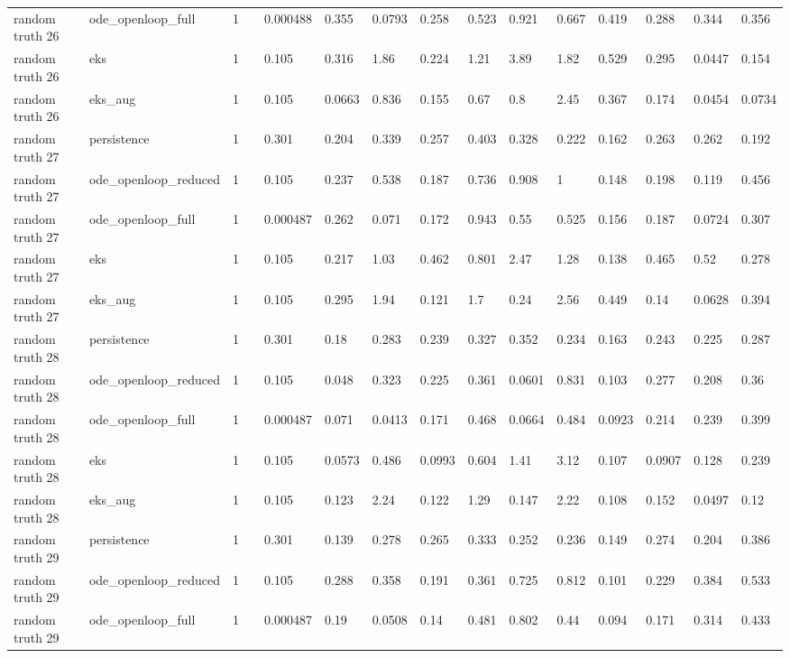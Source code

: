 \begin{table}[t]
\begin{tabular}{lllllllllllllll}
random truth 26 & ode\_openloop\_full & 1 &  & 0.000488 & 0.355 & 0.0793 & 0.258 & 0.523 & 0.921 & 0.667 & 0.419 & 0.288 & 0.344 & 0.356 \\
random truth 26 & eks & 1 &  & 0.105 & 0.316 & 1.86 & 0.224 & 1.21 & 3.89 & 1.82 & 0.529 & 0.295 & 0.0447 & 0.154 \\
random truth 26 & eks\_aug & 1 &  & 0.105 & 0.0663 & 0.836 & 0.155 & 0.67 & 0.8 & 2.45 & 0.367 & 0.174 & 0.0454 & 0.0734 \\
random truth 27 & persistence & 1 &  & 0.301 & 0.204 & 0.339 & 0.257 & 0.403 & 0.328 & 0.222 & 0.162 & 0.263 & 0.262 & 0.192 \\
random truth 27 & ode\_openloop\_reduced & 1 &  & 0.105 & 0.237 & 0.538 & 0.187 & 0.736 & 0.908 & 1 & 0.148 & 0.198 & 0.119 & 0.456 \\
random truth 27 & ode\_openloop\_full & 1 &  & 0.000487 & 0.262 & 0.071 & 0.172 & 0.943 & 0.55 & 0.525 & 0.156 & 0.187 & 0.0724 & 0.307 \\
random truth 27 & eks & 1 &  & 0.105 & 0.217 & 1.03 & 0.462 & 0.801 & 2.47 & 1.28 & 0.138 & 0.465 & 0.52 & 0.278 \\
random truth 27 & eks\_aug & 1 &  & 0.105 & 0.295 & 1.94 & 0.121 & 1.7 & 0.24 & 2.56 & 0.449 & 0.14 & 0.0628 & 0.394 \\
random truth 28 & persistence & 1 &  & 0.301 & 0.18 & 0.283 & 0.239 & 0.327 & 0.352 & 0.234 & 0.163 & 0.243 & 0.225 & 0.287 \\
random truth 28 & ode\_openloop\_reduced & 1 &  & 0.105 & 0.048 & 0.323 & 0.225 & 0.361 & 0.0601 & 0.831 & 0.103 & 0.277 & 0.208 & 0.36 \\
random truth 28 & ode\_openloop\_full & 1 &  & 0.000487 & 0.071 & 0.0413 & 0.171 & 0.468 & 0.0664 & 0.484 & 0.0923 & 0.214 & 0.239 & 0.399 \\
random truth 28 & eks & 1 &  & 0.105 & 0.0573 & 0.486 & 0.0993 & 0.604 & 1.41 & 3.12 & 0.107 & 0.0907 & 0.128 & 0.239 \\
random truth 28 & eks\_aug & 1 &  & 0.105 & 0.123 & 2.24 & 0.122 & 1.29 & 0.147 & 2.22 & 0.108 & 0.152 & 0.0497 & 0.12 \\
random truth 29 & persistence & 1 &  & 0.301 & 0.139 & 0.278 & 0.265 & 0.333 & 0.252 & 0.236 & 0.149 & 0.274 & 0.204 & 0.386 \\
random truth 29 & ode\_openloop\_reduced & 1 &  & 0.105 & 0.288 & 0.358 & 0.191 & 0.361 & 0.725 & 0.812 & 0.101 & 0.229 & 0.384 & 0.533 \\
random truth 29 & ode\_openloop\_full & 1 &  & 0.000487 & 0.19 & 0.0508 & 0.14 & 0.481 & 0.802 & 0.44 & 0.094 & 0.171 & 0.314 & 0.433 \\

\end{tabular}
\end{table}
